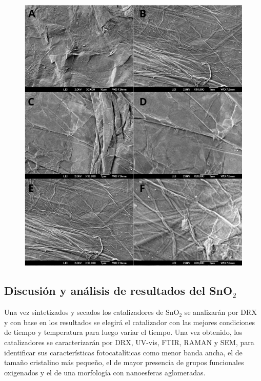 \documentclass[12pt]{article}
\begin{document}
\begin{figure}[H]
    	   \begin{center}
     	  	\includegraphics[width = 1\textwidth]{Imagenes/GO_SEM_1.png}
    	   \end{center} 
        \end{figure}
\subsection{Discusión y análisis de resultados del SnO$\displaystyle _{2}$}     
Una vez sintetizados y secados los catalizadores de SnO$\displaystyle _{2}$ se analizarán por DRX y con base en los resultados se elegirá el catalizador con las mejores condiciones de tiempo y temperatura para luego variar el tiempo. Una vez obtenido, los catalizadores se caracterizarán por DRX, UV-vis, FTIR, RAMAN y SEM, para identificar sus características fotocatalíticas como menor banda ancha, el de tamaño cristalino más pequeño, el de mayor presencia de grupos funcionales oxigenados y el de una morfología con nanoesferas aglomeradas. \vspace{1em} %
\end{document}

